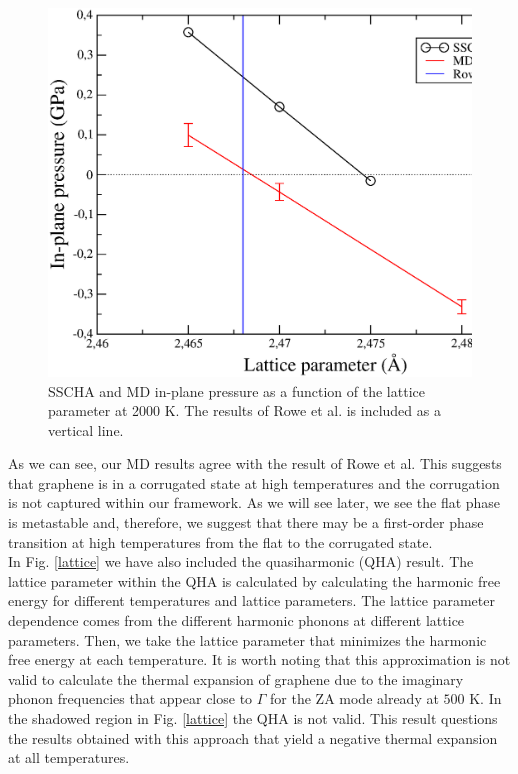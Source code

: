 \begin{figure}[ht]
\includegraphics[width=0.99\linewidth]{Figures/md2.eps}
\caption[Molecular dynamics results.]{SSCHA and MD in-plane pressure as a function of the lattice parameter at 
2000 K. The results of Rowe et al. is included as a vertical line.}
\label{md2}
\end{figure}
As we can see, our MD results agree with the result of Rowe et al. This suggests that graphene is in a corrugated 
state at high temperatures and the corrugation is not captured within our framework. As we will see later, we see 
the flat phase is metastable and, therefore, we suggest that there may be a first-order phase transition at high 
temperatures from the flat to the corrugated state. \\

In Fig. \ref{lattice} we have also included the quasiharmonic (QHA) result. The lattice parameter within 
the QHA is calculated by calculating the harmonic free energy for different temperatures and lattice parameters. The 
lattice parameter dependence comes from the different harmonic phonons at different lattice parameters. Then, we take 
the lattice parameter that minimizes the harmonic free energy at each temperature. It is worth noting that this 
approximation is not valid to calculate the thermal expansion of graphene due to the imaginary phonon frequencies 
that appear close to $\Gamma$ for the ZA mode already at $500$ K. In the shadowed region in Fig. \ref{lattice} the 
QHA is not valid. This result questions the results obtained with this approach that yield a negative thermal 
expansion at all temperatures\cite{mounet2005first}.

